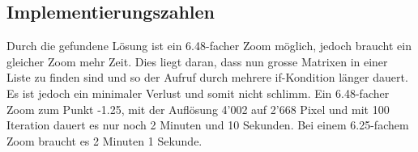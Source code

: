 \subsection{Implementierungszahlen}
Durch die gefundene Lösung ist ein 6.48-facher Zoom möglich, jedoch braucht ein gleicher Zoom mehr Zeit. Dies liegt daran, dass nun grosse Matrixen in einer Liste zu finden sind und so der Aufruf durch mehrere if-Kondition länger dauert. Es ist jedoch ein minimaler Verlust und somit nicht schlimm. Ein 6.48-facher Zoom zum Punkt -1.25, mit der Auflösung 4'002 auf 2'668 Pixel und mit 100 Iteration dauert es nur noch 2 Minuten und 10 Sekunden. Bei einem 6.25-fachem Zoom braucht es 2 Minuten 1 Sekunde.
